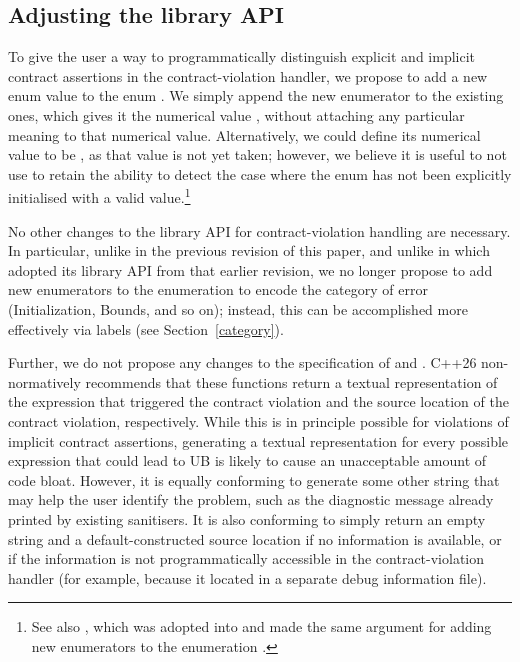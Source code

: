 \subsection{Adjusting the library API}
\label{library}

To give the user a way to programmatically distinguish explicit and implicit contract assertions in the contract-violation handler, we propose to add a new enum value  to the enum \mbox{}. We simply append the new enumerator to the existing ones, which gives it the numerical value , without attaching any particular meaning to that numerical value. Alternatively, we could define its numerical value to be , as that value is not yet taken; however, we believe it is useful to not use  to retain the ability to detect the case where the enum has not been explicitly initialised with a valid value.\footnote{See also \cite{P3227R0}, which was adopted into \cite{P2900R14} and made the same argument for adding new enumerators to the enumeration .}

No other changes to the library API for contract-violation handling are necessary. In particular, unlike in the previous revision of this paper, and unlike in \cite{P3081R1} which adopted its library API from that earlier revision, we no longer propose to add new enumerators to the enumeration \mbox{} to encode the category of error (Initialization, Bounds, and so on); instead, this can be accomplished more effectively via labels (see Section~\ref{category}).

Further, we do not propose any changes to the specification of  and . C++26 non-normatively recommends that these functions return a textual representation of the expression that triggered the contract violation and the source location of the contract violation, respectively. While this is in principle possible for violations of implicit contract assertions, generating a textual representation for every possible expression that could lead to UB is likely to cause an unacceptable amount of code bloat. However, it is equally conforming to generate some other string that may help the user identify the problem, such as the diagnostic message already printed by existing sanitisers. It is also conforming to simply return an empty string and a default-constructed source location if no information is available, or if the information is not programmatically accessible in the contract-violation handler (for example,
because it located in a separate debug information file). 

